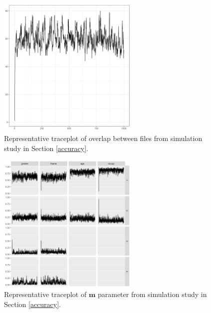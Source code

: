 \documentclass[ba]{imsart}
\begin{document}
	\begin{figure}[!h]
		\begin{center}
			\includegraphics[width=0.6\textwidth]{../notes/figures/sim_overlap_trace} 
			\caption{Representative traceplot of overlap between files from simulation study in Section \ref{accuracy}.}\label{fig:sim_overlap_trace}
		\end{center}
	\end{figure}
	
	
	\begin{figure}[!h]
		\begin{center}
			\includegraphics[width=0.6\textwidth]{../notes/figures/sim_m_trace} 
			\caption{Representative traceplot of $\bm{m}$ parameter from simulation study in Section \ref{accuracy}.}\label{fig:sim_m_trace}
		\end{center}
	\end{figure}
	
\end{document}
